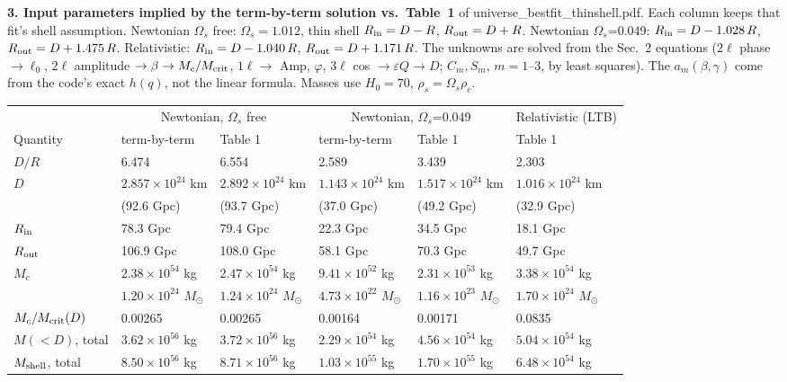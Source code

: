 \documentclass[10pt]{article}
\begin{document}
{\small
\textbf{3. Input parameters implied by the term-by-term solution vs.\ Table~1} of universe\_bestfit\_thinshell.pdf. Each column keeps that fit's shell assumption. Newtonian $\Omega_s$ free: $\Omega_s=1.012$, thin shell $R_{\rm in}=D-R$, $R_{\rm out}=D+R$. Newtonian $\Omega_s$=0.049: $R_{\rm in}=D-1.028\,R$, $R_{\rm out}=D+1.475\,R$. Relativistic: $R_{\rm in}=D-1.040\,R$, $R_{\rm out}=D+1.171\,R$. The unknowns are solved from the Sec.~2 equations ($2\ell$ phase $\to\ell_0$, $2\ell$ amplitude $\to\beta\to M_c/M_{\rm crit}$, $1\ell\to$ Amp, $\varphi$, $3\ell$ cos $\to\varepsilon Q\to D$; $C_m,S_m$, $m=1$--3, by least squares). The $a_m(\beta,\gamma)$ come from the code's exact $h(q)$, not the linear formula. Masses use $H_0=70$, $\rho_s=\Omega_s\rho_c$.
\begin{center}\footnotesize\setlength{\tabcolsep}{4.5pt}\begin{tabular}{llllll}\toprule
 & \multicolumn{2}{c}{Newtonian, $\Omega_s$ free} & \multicolumn{2}{c}{Newtonian, $\Omega_s$=0.049} & Relativistic (LTB)\\
Quantity & term-by-term & Table 1 & term-by-term & Table 1 & Table 1\\\midrule
$D/R$ & 6.474 & 6.554 & 2.589 & 3.439 & 2.303\\
$D$ & $2.857{\times}10^{24}$ km & $2.892{\times}10^{24}$ km & $1.143{\times}10^{24}$ km & $1.517{\times}10^{24}$ km & $1.016{\times}10^{24}$ km\\
 & (92.6 Gpc) & (93.7 Gpc) & (37.0 Gpc) & (49.2 Gpc) & (32.9 Gpc)\\
$R_{\rm in}$ & 78.3 Gpc & 79.4 Gpc & 22.3 Gpc & 34.5 Gpc & 18.1 Gpc\\
$R_{\rm out}$ & 106.9 Gpc & 108.0 Gpc & 58.1 Gpc & 70.3 Gpc & 49.7 Gpc\\
$M_c$ & $2.38{\times}10^{54}$ kg & $2.47{\times}10^{54}$ kg & $9.41{\times}10^{52}$ kg & $2.31{\times}10^{53}$ kg & $3.38{\times}10^{54}$ kg\\
 & $1.20{\times}10^{24}$ $M_\odot$ & $1.24{\times}10^{24}$ $M_\odot$ & $4.73{\times}10^{22}$ $M_\odot$ & $1.16{\times}10^{23}$ $M_\odot$ & $1.70{\times}10^{24}$ $M_\odot$\\
$M_c/M_{\rm crit}(D)$ & 0.00265 & 0.00265 & 0.00164 & 0.00171 & 0.0835\\
$M(<D)$, total & $3.62{\times}10^{56}$ kg & $3.72{\times}10^{56}$ kg & $2.29{\times}10^{54}$ kg & $4.56{\times}10^{54}$ kg & $5.04{\times}10^{54}$ kg\\
$M_{\rm shell}$, total & $8.50{\times}10^{56}$ kg & $8.71{\times}10^{56}$ kg & $1.03{\times}10^{55}$ kg & $1.70{\times}10^{55}$ kg & $6.48{\times}10^{54}$ kg\\

\end{tabular}
\end{center}}
\end{document}
